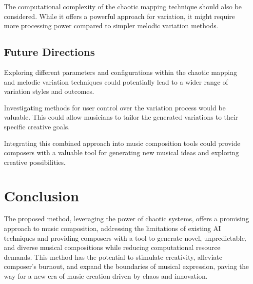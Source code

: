 \documentclass[11pt]{article}
\theoremstyle{definition}
\begin{document}
The computational complexity of the chaotic mapping technique should also be considered. While it offers a powerful approach for variation, it might require more processing power compared to simpler melodic variation methods.

\subsection{Future Directions}

Exploring different parameters and configurations within the chaotic mapping and melodic variation techniques could potentially lead to a wider range of variation styles and outcomes.

Investigating methods for user control over the variation process would be valuable. This could allow musicians to tailor the generated variations to their specific creative goals.

Integrating this combined approach into music composition tools could provide composers with a valuable tool for generating new musical ideas and exploring creative possibilities.

\section{Conclusion}
\label{sec: conclusion}
The proposed method, leveraging the power of chaotic systems, offers a promising approach to music composition, addressing the limitations of existing AI techniques and providing composers with a tool to generate novel, unpredictable, and diverse musical compositions while reducing computational resource demands. This method has the potential to stimulate creativity, alleviate composer's burnout, and expand the boundaries of musical expression, paving the way for a new era of music creation driven by chaos and innovation.

\printbibliography
\end{document}
